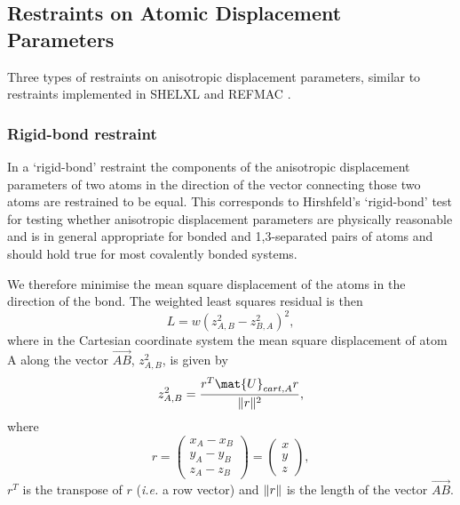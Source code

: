 \documentclass[pdf]{iucr}
\begin{document}


\subsection{Restraints on Atomic Displacement Parameters}

Three types of restraints on anisotropic displacement parameters, similar to restraints implemented in SHELXL \cite{Sheldrick:sc5010} and REFMAC \cite{Murshudov:li0304}.

\subsubsection{Rigid-bond restraint}

In a `rigid-bond' restraint the components of the anisotropic displacement parameters of two atoms in the direction of the vector connecting those two atoms are restrained to be equal. This corresponds to Hirshfeld's `rigid-bond' test \cite{Hirshfeld:a12865} for testing whether anisotropic displacement parameters are physically reasonable \cite{SHELX:man97} and is in general appropriate for bonded and 1,3-separated pairs of atoms and should hold true for most covalently bonded systems.

We therefore minimise the mean square displacement of the atoms in the direction of the bond. The weighted least squares residual is then
\begin{equation}
\label{eq:rigid_bond}
L = w(z^2_{A,B} - z^2_{B,A})^2,
\end{equation}
where in the Cartesian coordinate system the mean square displacement of atom A
along the vector $\overrightarrow{AB}$, $z^2_{A,B}$, is given by
\begin{equation}
z^2_{A,B} = \frac{r^T\mat{U}_{cart,A}r}{\norm{r}^2},
\end{equation}
where
\begin{equation}
r = \begin{pmatrix} x_A - x_B\\y_A - y_B\\z_A - z_B \end{pmatrix}
= \begin{pmatrix} x\\y\\z \end{pmatrix},
\end{equation}
$r^T$ is the transpose of $r$ (\textit{i.e.} a row vector) and
$\| r \|$ is the length of the vector $\overrightarrow{AB}$.
\end{document}
